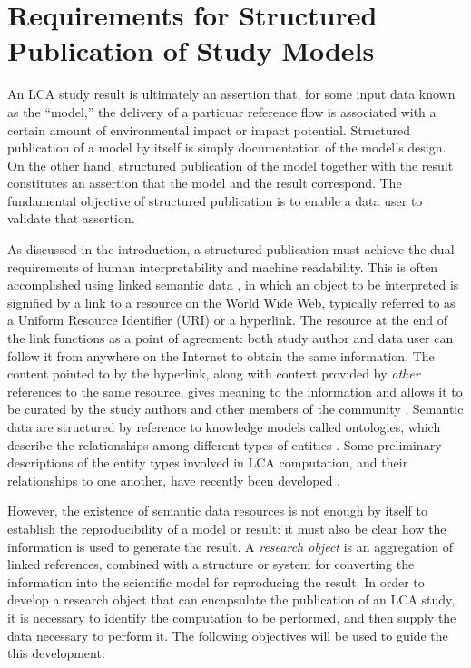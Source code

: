 \section{Requirements for Structured Publication of Study Models}

An LCA study result is ultimately an assertion that, for some input data known as the ``model,'' the delivery of a particuar reference flow %
is associated with a certain amount of environmental impact or impact potential.  Structured publication of a model by itself is simply documentation of the model's design.  On the other hand, structured publication of the model together with the result constitutes an assertion that the model and the result correspond.  The fundamental objective of structured publication is to enable a data user to validate that assertion.

As discussed in the introduction, a structured publication %
must achieve the dual requirements of human interpretability and machine readability.  %
This is often accomplished using linked semantic data \citep{Bizer_2009}, in which an object to be interpreted is signified by a link to a resource on the World Wide Web, typically referred to as a Uniform Resource Identifier (URI) or a hyperlink.  The resource at the end of the link functions as a point of agreement: both study author and data user can follow it from anywhere on the Internet to obtain the same information.  The content pointed to by the hyperlink, along with context provided by \emph{other} references to the same resource, gives meaning to the information and allows it to be curated by the study authors and other members of the community \citep{Khan_2011}.  Semantic data are structured by reference to knowledge models called ontologies, which describe the relationships among different types of entities \citep{Madin2008}.  
Some preliminary descriptions of the entity types involved in LCA computation, and their relationships to one another, have recently been developed \citep{Ciroth_Srocka_2014, Janowicz_WOP_2015, Kuczenski_JCP_2016}.

However, the existence of semantic data resources is not enough by itself to establish the reproducibility of a model or result: it must also be clear how the information is used to generate the result.  A \emph{research object} \citep{Bechhofer_2013} is an aggregation of linked references, combined with a structure or system for converting the information into the scientific model for reproducing the result.  In order to develop a research object that can encapsulate the publication of an LCA study, it is necessary to identify the computation to be performed, and then supply the data necessary to perform it. The following objectives will be used to guide the this development:

